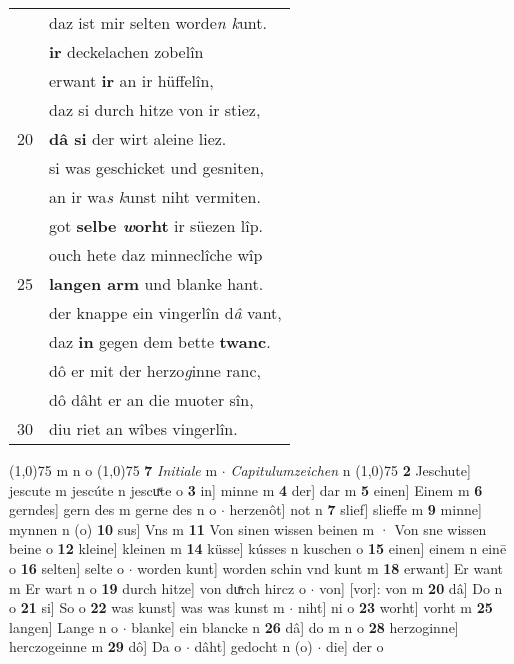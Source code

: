 \documentclass[8pt,a4paper,notitlepage]{article}
\begin{document}
\begin{table}[ht]
\begin{minipage}[t]{0.5\linewidth}
\begin{tabular}{rl}
 & daz ist mir selten worde\textit{n k}unt.\\ 
 & \textbf{ir} deckelachen zobelîn\\ 
 & erwant \textbf{ir} an ir hüffelîn,\\ 
 & daz si durch hitze von ir stiez,\\ 
20 & \textbf{dâ si} der wirt aleine liez.\\ 
 & si was geschicket und gesniten,\\ 
 & an ir wa\textit{s k}unst niht vermiten.\\ 
 & got \textbf{selbe \textit{w}orht} ir süezen lîp.\\ 
 & ouch hete daz minneclîche wîp\\ 
25 & \textbf{langen arm} und blanke hant.\\ 
 & der knappe ein vingerlîn d\textit{â} vant,\\ 
 & daz \textbf{in} gegen dem bette \textbf{twanc}.\\ 
 & dô er mit der herzo\textit{g}inne ranc,\\ 
 & dô dâht er an die muoter sîn,\\ 
30 & diu riet an wîbes vingerlîn.\\ 
\end{tabular}
\scriptsize
\line(1,0){75} \newline
m n o \newline
\line(1,0){75} \newline
\textbf{7} \textit{Initiale} m   $\cdot$ \textit{Capitulumzeichen} n  \newline
\line(1,0){75} \newline
\textbf{2} Jeschute] jescute m jescúte n jescuͯte o \textbf{3} in] minne m \textbf{4} der] dar m \textbf{5} einen] Einem m \textbf{6} gerndes] gern des m gerne des n o  $\cdot$ herzenôt] not n \textbf{7} slief] slieffe m \textbf{9} minne] mynnen n (o) \textbf{10} sus] Vns m \textbf{11} Von sinen wissen beinen m · Von sne wissen beine o \textbf{12} kleine] kleinen m \textbf{14} küsse] kússes n kuschen o \textbf{15} einen] einem n einē o \textbf{16} selten] selte o  $\cdot$ worden kunt] worden schin vnd kunt m \textbf{18} erwant] Er want m Er wart n o \textbf{19} durch hitze] von duͯrch hircz o  $\cdot$ von] [vor]: von m \textbf{20} dâ] Do n o \textbf{21} si] So o \textbf{22} was kunst] was was kunst m  $\cdot$ niht] ni o \textbf{23} worht] vorht m \textbf{25} langen] Lange n o  $\cdot$ blanke] ein blancke n \textbf{26} dâ] do m n o \textbf{28} herzoginne] herczogeinne m \textbf{29} dô] Da o  $\cdot$ dâht] gedocht n (o)  $\cdot$ die] der o \newline
\end{minipage}
\end{table}
\end{document}
